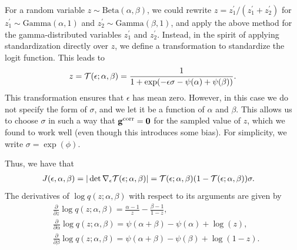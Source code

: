 \documentclass{article}
\begin{document}
For a random variable $z\sim\textrm{Beta}(\alpha,\beta)$, we could rewrite $z=z_1^\prime/(z_1^\prime+z_2^\prime)$ for $z_1^\prime\sim\textrm{Gamma}(\alpha,1)$ and $z_2^\prime\sim\textrm{Gamma}(\beta,1)$, and apply the above method for the gamma-distributed variables $z_1^\prime$ and $z_2^\prime$. Instead, in the spirit of applying standardization directly over $z$, we define a transformation to standardize the logit function. This leads to
\begin{align}
    z=\mathcal{T}(\epsilon;\alpha,\beta)=\frac{1}{1+\exp(-\epsilon\sigma-\psi(\alpha)+\psi(\beta))}.
\end{align}
This transformation ensures that $\epsilon$ has mean zero. However, in this case we do not specify the form of $\sigma$, and we let it be a function of $\alpha$ and $\beta$. This allows us to choose $\sigma$ in such a way that $\mathbf{g}^{\textrm{corr}}=\mathbf{0}$ for the sampled value of $z$, which we found to work well (even though this introduces some bias). For simplicity, we write $\sigma=\exp(\phi)$.

Thus, we have that
\begin{align}
    & J(\epsilon,\alpha,\beta) = |\det \nabla_{\epsilon}\mathcal{T}(\epsilon;\alpha,\beta)| = \mathcal{T}(\epsilon;\alpha,\beta)(1-\mathcal{T}(\epsilon;\alpha,\beta))\sigma.
\end{align}
The derivatives of $\log q(z;\alpha,\beta)$ with respect to its arguments are given by
\begin{align}
    & \frac{\partial}{\partial z}\log q(z;\alpha,\beta) = \frac{\alpha-1}{z} - \frac{\beta-1}{1-z},\\
    & \frac{\partial}{\partial \alpha}\log q(z;\alpha,\beta) = \psi(\alpha+\beta)-\psi(\alpha)+\log(z),\\
    & \frac{\partial}{\partial \beta}\log q(z;\alpha,\beta) = \psi(\alpha+\beta)-\psi(\beta)+\log(1-z).
\end{align}
\end{document}
